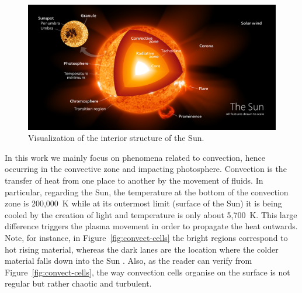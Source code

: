 \begin{figure}[t]
    \centering
    \captionsetup{justification=centering}
    \includegraphics[width=\textwidth]{./pictures/interior.PNG}
    \caption{Visualization of the interior structure of the Sun. \cite{kelvin13}}
    \label{fig:structure}
\end{figure}
\bigbreak
\noindent In this work we mainly focus on phenomena related to convection, hence occurring in the convective zone and impacting photosphere. Convection is the transfer of heat from one place to another by the movement of fluids. In particular, regarding the Sun, the temperature at the bottom of the convection zone is 200,000\textdegree\ K while at its outermost limit (surface of the Sun) it is being cooled by the creation of light and temperature is only about 5,700\textdegree\ K. This large difference triggers the plasma movement in order to propagate the heat outwards. Note, for instance, in Figure~\ref{fig:convect-cells} the bright regions correspond to hot rising material, whereas the dark lanes are the location where the colder material falls down into the Sun \cite{convect}. Also, as the reader can verify from Figure~\ref{fig:convect-cells}, the way convection cells organise on the surface is not regular but rather chaotic and turbulent.
